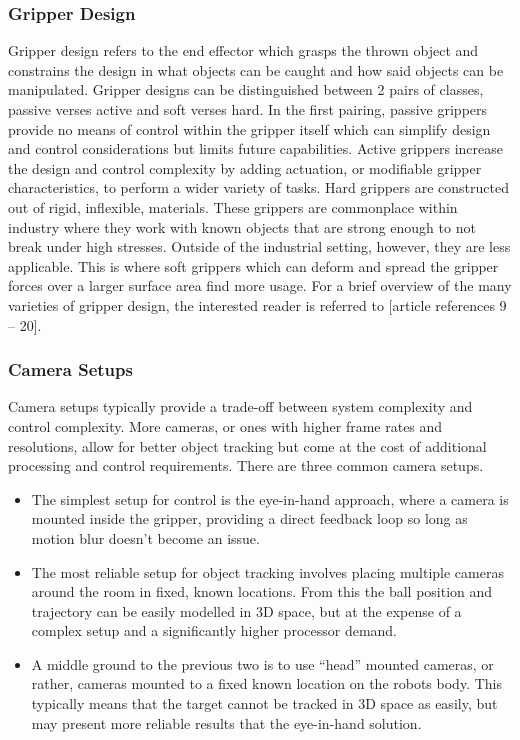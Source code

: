 \documentclass[conference]{IEEEtran}
\begin{document}
	\subsubsection{Gripper Design}
	Gripper design refers to the end effector which grasps the thrown object and constrains the design in what objects can be caught and how said objects can be manipulated. Gripper designs can be distinguished between 2 pairs of classes, passive verses active and soft verses hard.
	In the first pairing, passive grippers provide no means of control within the gripper itself which can simplify design and control considerations but limits future capabilities. Active grippers increase the design and control complexity by adding actuation, or modifiable gripper characteristics, to perform a wider variety of tasks.
	Hard grippers are constructed out of rigid, inflexible, materials. These grippers are commonplace within industry where they work with known objects that are strong enough to not break under high stresses. Outside of the industrial setting, however, they are less applicable. This is where soft grippers which can deform and spread the gripper forces over a larger surface area find more usage.
	For a brief overview of the many varieties of gripper design, the interested reader is referred to [article references 9 – 20].
	
	\subsubsection{Camera Setups}
	Camera setups typically provide a trade-off between system complexity and control complexity. More cameras, or ones with higher frame rates and resolutions, allow for better object tracking but come at the cost of additional processing and control requirements.
	There are three common camera setups.
	\begin{itemize}
		\item The simplest setup for control is the eye-in-hand approach, where a camera is mounted inside the gripper, providing a direct feedback loop so long as motion blur doesn’t become an issue.
		\item The most reliable setup for object tracking involves placing multiple cameras around the room in fixed, known locations. From this the ball position and trajectory can be easily modelled in 3D space, but at the expense of a complex setup and a significantly higher processor demand.
		\item A middle ground to the previous two is to use “head” mounted cameras, or rather, cameras mounted to a fixed known location on the robots body. This typically means that the target cannot be tracked in 3D space as easily, but may present more reliable results that the eye-in-hand solution. 
	\end{itemize}
\end{document}
